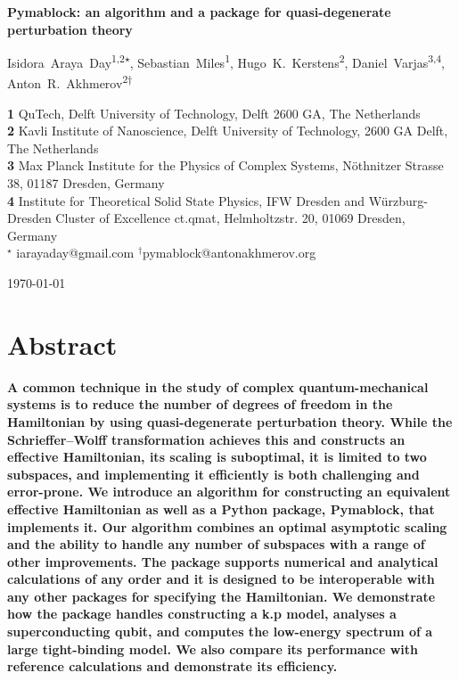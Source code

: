 \documentclass[submission, Codebases]{SciPost}
\begin{document}
\begin{center}
{\Large \textbf{Pymablock: an algorithm and a package for quasi-degenerate perturbation theory}}
\end{center}

\begin{center}
Isidora~Araya~Day\textsuperscript{1,2$\star$},
Sebastian~Miles\textsuperscript{1},
Hugo~K.~Kerstens\textsuperscript{2},
Daniel~Varjas\textsuperscript{3,4},
Anton~R.~Akhmerov\textsuperscript{2$\dagger$}
\end{center}

\begin{center}
\textbf{1} QuTech, Delft University of Technology, Delft 2600 GA, The Netherlands \\
\textbf{2} Kavli Institute of Nanoscience, Delft University of Technology, 2600 GA Delft, The Netherlands \\
\textbf{3} Max Planck Institute for the Physics of Complex Systems, Nöthnitzer Strasse 38, 01187 Dresden, Germany \\
\textbf{4} Institute for Theoretical Solid State Physics, IFW Dresden and W\"{u}rzburg-Dresden Cluster of Excellence ct.qmat, Helmholtzstr. 20, 01069 Dresden, Germany \\
${}^\star$ {\small \sf iarayaday@gmail.com}
${}^\dagger${\small \sf pymablock@antonakhmerov.org}
\end{center}

\begin{center}
    \today
\end{center}

\section*{Abstract}
\textbf{
A common technique in the study of complex quantum-mechanical systems is to reduce the number of degrees of freedom in the Hamiltonian by using quasi-degenerate perturbation theory.
While the Schrieffer--Wolff transformation achieves this and constructs an effective Hamiltonian, its scaling is suboptimal, it is limited to two subspaces, and implementing it efficiently is both challenging and error-prone.
We introduce an algorithm for constructing an equivalent effective Hamiltonian as well as a Python package, Pymablock, that implements it.
Our algorithm combines an optimal asymptotic scaling and the ability to handle any number of subspaces with a range of other improvements.
The package supports numerical and analytical calculations of any order and it is designed to be interoperable with any other packages for specifying the Hamiltonian.
We demonstrate how the package handles constructing a k.p model, analyses a superconducting qubit, and computes the low-energy spectrum of a large tight-binding model.
We also compare its performance with reference calculations and demonstrate its efficiency.
}
\end{document}
